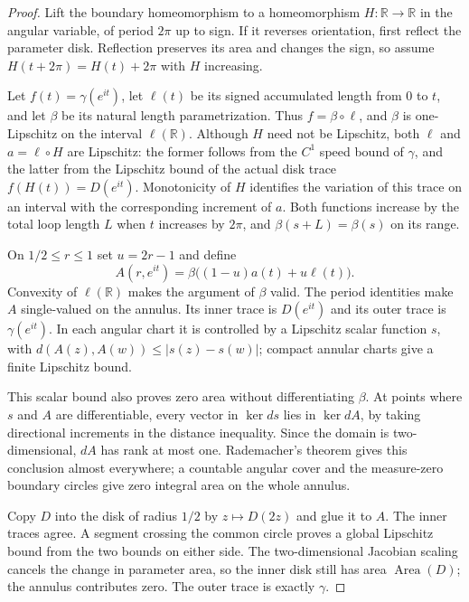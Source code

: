 \begin{proof}
Lift the boundary homeomorphism to a homeomorphism $H:\mathbb R\to
\mathbb R$ in the angular variable, of period $2\pi$ up to sign.
If it reverses orientation, first reflect the parameter disk. Reflection
preserves its area and changes the sign, so assume
$H(t+2\pi)=H(t)+2\pi$ with $H$ increasing.

Let $f(t)=\gamma(e^{it})$, let $\ell(t)$ be its signed accumulated
length from $0$ to $t$, and let $\beta$ be its natural length
parametrization. Thus $f=\beta\circ\ell$, and $\beta$ is
one-Lipschitz on the interval $\ell(\mathbb R)$. Although $H$ need
not be Lipschitz, both $\ell$ and $a=\ell\circ H$ are Lipschitz:
the former follows from the $C^1$ speed bound of $\gamma$, and the
latter from the Lipschitz bound of the actual disk trace
$f(H(t))=D(e^{it})$. Monotonicity of $H$ identifies the variation of
this trace on an interval with the corresponding increment of $a$.
Both functions increase by the total loop length $L$ when $t$ increases
by $2\pi$, and $\beta(s+L)=\beta(s)$ on its range.

On $1/2\leq r\leq1$ set $u=2r-1$ and define
\[
 A(r,e^{it})=\beta\bigl((1-u)a(t)+u\ell(t)\bigr).
\]
Convexity of $\ell(\mathbb R)$ makes the argument of $\beta$ valid.
The period identities make $A$ single-valued on the annulus. Its inner
trace is $D(e^{it})$ and its outer trace is $\gamma(e^{it})$.
In each angular chart it is controlled by a Lipschitz scalar function
$s$, with $d(A(z),A(w))\leq|s(z)-s(w)|$; compact annular charts give
a finite Lipschitz bound.

This scalar bound also proves zero area without differentiating
$\beta$. At points where $s$ and $A$ are differentiable, every vector
in $\ker ds$ lies in $\ker dA$, by taking directional increments in
the distance inequality. Since the domain is two-dimensional,
$dA$ has rank at most one. Rademacher's theorem gives this conclusion
almost everywhere; a countable angular cover and the measure-zero
boundary circles give zero integral area on the whole annulus.

Copy $D$ into the disk of radius $1/2$ by $z\mapsto D(2z)$ and glue
it to $A$. The inner traces agree. A segment crossing the common
circle proves a global Lipschitz bound from the two bounds on either
side. The two-dimensional Jacobian scaling cancels the change in
parameter area, so the inner disk still has area $\operatorname{Area}(D)$;
the annulus contributes zero. The outer trace is exactly $\gamma$.
\end{proof}

